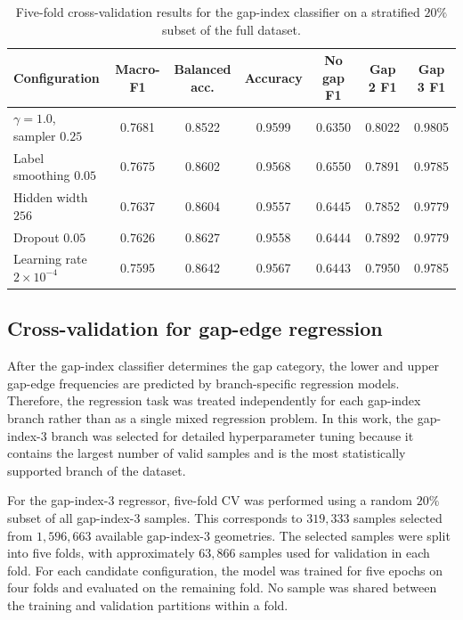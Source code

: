 \begin{table}[htbp]
    \centering
    \caption{Five-fold cross-validation results for the gap-index classifier on a stratified $20\%$ subset of the full dataset.}
    \label{tab:classifier_cv}
    \begin{tabular}{lcccccc}
        \toprule
        Configuration & Macro-F1 & Balanced acc. & Accuracy & No gap F1 & Gap 2 F1 & Gap 3 F1 \\
        \midrule
        $\gamma=1.0$, sampler $0.25$ & 0.7681 & 0.8522 & 0.9599 & 0.6350 & 0.8022 & 0.9805 \\
        Label smoothing $0.05$       & 0.7675 & 0.8602 & 0.9568 & 0.6550 & 0.7891 & 0.9785 \\
        Hidden width $256$           & 0.7637 & 0.8604 & 0.9557 & 0.6445 & 0.7852 & 0.9779 \\
        Dropout $0.05$               & 0.7626 & 0.8627 & 0.9558 & 0.6444 & 0.7892 & 0.9779 \\
        Learning rate $2\times10^{-4}$ & 0.7595 & 0.8642 & 0.9567 & 0.6443 & 0.7950 & 0.9785 \\
        \bottomrule
    \end{tabular}
\end{table}

\subsection{Cross-validation for gap-edge regression}

After the gap-index classifier determines the gap category, the lower and upper gap-edge frequencies are predicted by branch-specific regression models. Therefore, the regression task was treated independently for each gap-index branch rather than as a single mixed regression problem. In this work, the gap-index-3 branch was selected for detailed hyperparameter tuning because it contains the largest number of valid samples and is the most statistically supported branch of the dataset.

For the gap-index-3 regressor, five-fold CV was performed using a random $20\%$ subset of all gap-index-3 samples. This corresponds to $319{,}333$ samples selected from $1{,}596{,}663$ available gap-index-3 geometries. The selected samples were split into five folds, with approximately $63{,}866$ samples used for validation in each fold. For each candidate configuration, the model was trained for five epochs on four folds and evaluated on the remaining fold. No sample was shared between the training and validation partitions within a fold.

